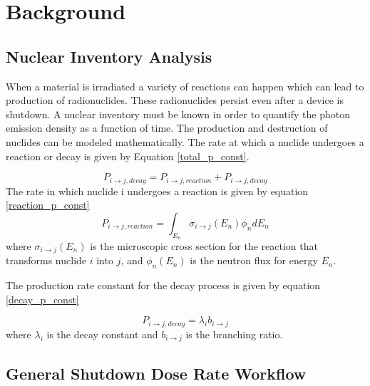 \section{Background}


\subsection{Nuclear Inventory Analysis}
When a material is irradiated a variety of reactions can happen which
can lead to production of radionuclides. These radionuclides persist
even after a device is shutdown. A nuclear inventory must be known
in order to quantify the photon emission density as a function of time.
The production and destruction of nuclides can be modeled mathematically.
The rate at which a nuclide undergoes a reaction or decay is given by
Equation \ref{total_p_const}.

\begin{equation}\label{total_p_const}
  P_{i \rightarrow j, decay} = P_{i \rightarrow j, reaction } +
  P_{i \rightarrow j, decay}
\end{equation}
The rate in which nuclide i undergoes a reaction is given by equation \ref{reaction_p_const}
\begin{equation}\label{reaction_p_const}
  P_{i \rightarrow j, reaction } =
  \int_{E_{n}} \sigma_{i \rightarrow j}(E_{n})
  \phi_{n}dE_{n}
\end{equation}
where $\sigma_{i \rightarrow j}(E_{n})$ is the microscopic cross
section for the reaction that transforms nuclide $i$ into $j$, and
 $\phi_{n}(E_{n})$ is the neutron flux for energy $E_{n}$.

The production rate constant for the decay process is given by equation
\ref{decay_p_const}

\begin{equation}\label{decay_p_const}
  P_{i \rightarrow j, decay} = \lambda_{i} b_{i \rightarrow j}
\end{equation}
where $\lambda_{i}$ is the decay constant and $b_{i \rightarrow j}$ is
the branching ratio.


\subsection{General Shutdown Dose Rate Workflow}


